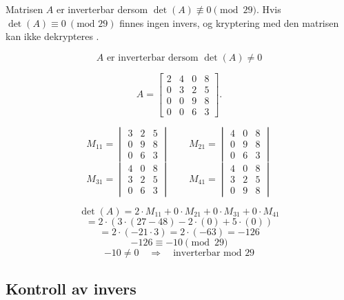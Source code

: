 \documentclass[12pt,a4paper]{article}
\begin{document}
Matrisen $A$ er inverterbar dersom
$
\det(A)\not\equiv 0 \pmod{29}.
$
Hvis $\det(A)\equiv0\ (\text{mod }29)$ finnes ingen invers, og kryptering med
den matrisen kan ikke dekrypteres \cite{minini2026}.

\[ A \text{ er inverterbar dersom }\det(A)\neq 0 \] 

\vspace{2mm}

\[ A= \begin{bmatrix} 2 & 4 & 0 & 8 \\ 0 & 3 & 2 & 5 \\ 0 & 0 & 9 & 8 \\ 0 & 0 & 6 & 3 \end{bmatrix}. \]

\[ M_{11}= \begin{vmatrix} 3 & 2 & 5\\ 0 & 9 & 8\\ 0 & 6 & 3 \end{vmatrix} \qquad M_{21}= \begin{vmatrix} 4 & 0 & 8\\ 0 & 9 & 8\\ 0 & 6 & 3 \end{vmatrix} \]
\[ M_{31}= \begin{vmatrix} 4 & 0 & 8\\ 3 & 2 & 5\\ 0 & 6 & 3 \end{vmatrix} \qquad M_{41}= \begin{vmatrix} 4 & 0 & 8\\ 3 & 2 & 5\\ 0 & 9 & 8 \end{vmatrix} \] 

\vspace{2mm}

\[ \det(A) = 2\cdot M_{11} + 0\cdot M_{21} + 0\cdot M_{31} + 0\cdot M_{41} \] \[ = 2\cdot \left( 3\cdot(27-48) - 2\cdot(0) + 5\cdot(0) \right) \] \[ = 2\cdot(-21\cdot3) = 2\cdot(-63) = -126 \] \[ -126 \equiv -10 \pmod{29} \] \vspace{2mm}
\[ -10 \neq 0 \quad\Rightarrow\quad \text{inverterbar mod }29 \]

\subsection{ Kontroll av invers}

\vspace{2mm}
\end{document}
